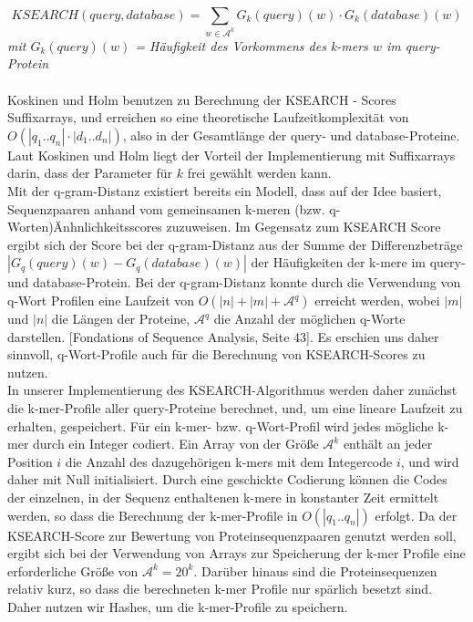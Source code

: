 \documentclass{article}
\begin{document}
\begin{equation}
KSEARCH(query,database) = \sum_{w \in \mathcal A^k} G_k(query)(w) \cdot G_k(database)(w)
\end{equation}  
\textit{mit $G_k(query)(w)$ = Häufigkeit des Vorkommens des k-mers $w$ im query-Protein}\\ \\

Koskinen und Holm benutzen zu Berechnung der KSEARCH - Scores Suffixarrays, und erreichen so eine theoretische Laufzeitkomplexität von $O(|q_1..q_n| \cdot |d_1..d_n|)$, also in der Gesamtlänge der query- und database-Proteine. Laut Koskinen und Holm liegt der Vorteil der Implementierung mit Suffixarrays darin, dass der Parameter für $k$ frei gewählt werden kann. \\
Mit der q-gram-Distanz existiert bereits ein Modell, dass auf der Idee basiert, Sequenzpaaren anhand vom gemeinsamen k-meren (bzw. q-Worten)Änhnlichkeitsscores zuzuweisen. Im Gegensatz zum KSEARCH Score ergibt sich der Score bei der q-gram-Distanz aus der Summe der Differenzbeträge $|G_q(query)(w) - G_q(database)(w)|$ der Häufigkeiten der k-mere im query- und database-Protein. Bei der q-gram-Distanz konnte durch die Verwendung von q-Wort Profilen eine Laufzeit von $O(|n|+|m|+\mathcal{A}^q)$ erreicht werden, wobei $|m|$ und $|n|$ die Längen der Proteine, $\mathcal{A}^q$ die Anzahl der möglichen q-Worte darstellen. [Fondations of Sequence Analysis, Seite 43]. Es erschien uns daher sinnvoll, q-Wort-Profile auch für die Berechnung von KSEARCH-Scores zu nutzen.\\
In unserer Implementierung des KSEARCH-Algorithmus werden daher zunächst die k-mer-Profile aller query-Proteine berechnet, und, um eine lineare Laufzeit zu erhalten, gespeichert. Für ein k-mer- bzw. q-Wort-Profil wird jedes mögliche k-mer durch ein Integer codiert. Ein Array von der Größe $\mathcal{A}^k$ enthält an jeder Position $i$ die Anzahl des dazugehörigen k-mers mit dem Integercode $i$, und wird daher mit Null initialisiert. Durch eine geschickte Codierung können die Codes der einzelnen, in der Sequenz enthaltenen k-mere in konstanter Zeit ermittelt werden, so dass die Berechnung der k-mer-Profile in ${O(|q_1..q_n|)}$ erfolgt. Da der KSEARCH-Score zur Bewertung von Proteinsequenzpaaren genutzt werden soll, ergibt sich bei der Verwendung von Arrays zur Speicherung der k-mer Profile eine erforderliche Größe von $\mathcal{A}^k = 20^k$. Darüber hinaus sind die Proteinsequenzen relativ kurz, so dass die berechneten k-mer Profile nur spärlich besetzt sind. Daher nutzen wir Hashes, um die k-mer-Profile zu speichern. \\
\end{document}
